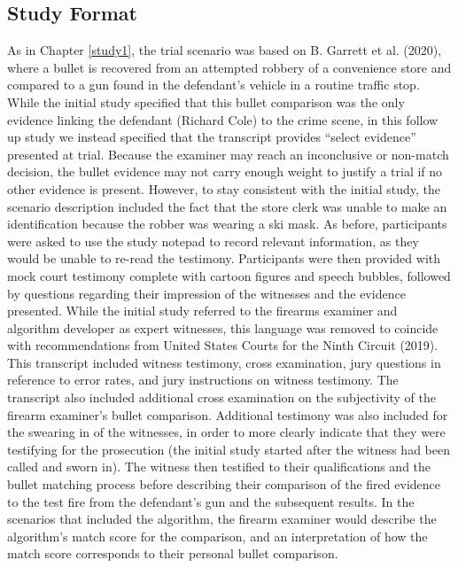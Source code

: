 \documentclass[print]{nuthesis}
\begin{document}
\hypertarget{study-format-2}{%
\subsection{Study Format}\label{study-format-2}}

As in Chapter \ref{study1}, the trial scenario was based on B. Garrett et al. (2020), where a bullet is recovered from an attempted robbery of a convenience store and compared to a gun found in the defendant's vehicle in a routine traffic stop.
While the initial study specified that this bullet comparison was the only evidence linking the defendant (Richard Cole) to the crime scene, in this follow up study we instead specified that the transcript provides ``select evidence'' presented at trial.
Because the examiner may reach an inconclusive or non-match decision, the bullet evidence may not carry enough weight to justify a trial if no other evidence is present.
However, to stay consistent with the initial study, the scenario description included the fact that the store clerk was unable to make an identification because the robber was wearing a ski mask.
As before, participants were asked to use the study notepad to record relevant information, as they would be unable to re-read the testimony.
Participants were then provided with mock court testimony complete with cartoon figures and speech bubbles, followed by questions regarding their impression of the witnesses and the evidence presented.
While the initial study referred to the firearms examiner and algorithm developer as expert witnesses, this language was removed to coincide with recommendations from United States Courts for the Ninth Circuit (2019).
This transcript included witness testimony, cross examination, jury questions in reference to error rates, and jury instructions on witness testimony.
The transcript also included additional cross examination on the subjectivity of the firearm examiner's bullet comparison.
Additional testimony was also included for the swearing in of the witnesses, in order to more clearly indicate that they were testifying for the prosecution (the initial study started after the witness had been called and sworn in).
The witness then testified to their qualifications and the bullet matching process before describing their comparison of the fired evidence to the test fire from the defendant's gun and the subsequent results.
In the scenarios that included the algorithm, the firearm examiner would describe the algorithm's match score for the comparison, and an interpretation of how the match score corresponds to their personal bullet comparison.
\end{document}
